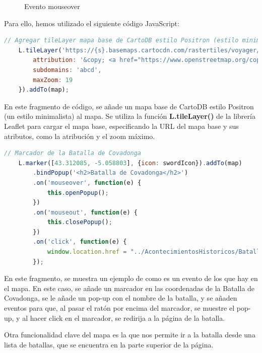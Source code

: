 \documentclass{article}
\begin{document}
\begin{figure}[H]
\begin{minipage}{0.49\textwidth}
        \caption{Evento mouseover}
        \label{fig:prototipo_foro}
    \end{minipage}
\end{figure}


\newpage

Para ello, hemos utilizado el siguiente código JavaScript:

\begin{lstlisting}[language=JavaScript, caption=Código para cargar el mapa]
    // Agregar tileLayer mapa base de CartoDB estilo Positron (estilo minimalista)
    L.tileLayer('https://{s}.basemaps.cartocdn.com/rastertiles/voyager/{z}/{x}/{y}{r}.png', {
        attribution: '&copy; <a href="https://www.openstreetmap.org/copyright">OpenStreetMap</a> contributors &copy; <a href="https://carto.com/attributions">CARTO</a>',
        subdomains: 'abcd',
        maxZoom: 19
    }).addTo(map);
\end{lstlisting}

En este fragmento de código, se añade un mapa base de CartoDB estilo Positron (un estilo minimalista) al mapa. Se utiliza la función \textbf{L.tileLayer()} de la librería Leaflet para cargar el mapa base, especificando la URL del mapa base y sus atributos, como la atribución y el zoom máximo.

\begin{lstlisting}[language=JavaScript, caption=Código para añadir los marcadores al mapa]
    // Marcador de la Batalla de Covadonga
    L.marker([43.312085, -5.058803], {icon: swordIcon}).addTo(map)
        .bindPopup('<h2>Batalla de Covadonga</h2>')
        .on('mouseover', function(e) {
            this.openPopup();
        })
        .on('mouseout', function(e) {
            this.closePopup();
        })
        .on('click', function(e) {
            window.location.href = "../AcontecimientosHistoricos/Batallas/batallaCovadonga.html";
        });
\end{lstlisting}

En este fragmento, se muestra un ejemplo de como es un evento de los que hay en el mapa. En este caso, se añade un marcador en las coordenadas de la Batalla de Covadonga, se le añade un pop-up con el nombre de la batalla, y se añaden eventos para que, al pasar el ratón por encima del marcador, se muestre el pop-up, y al hacer click en el marcador, se redirija a la página de la batalla.

Otra funcionalidad clave del mapa es la que nos permite ir a la batalla desde una lista de batallas, que se encuentra en la parte superior de la página. 
\end{document}
